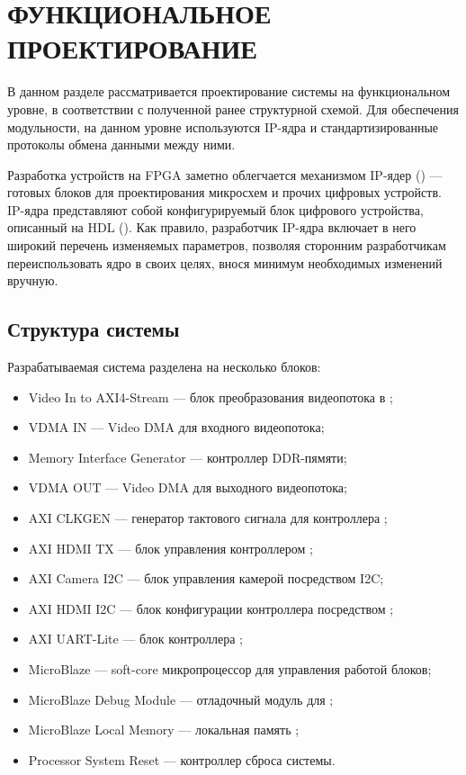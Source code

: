 \section{ФУНКЦИОНАЛЬНОЕ ПРОЕКТИРОВАНИЕ}
\label{sec:functional}

В данном разделе рассматривается проектирование системы на функциональном уровне, в
соответствии с полученной ранее структурной схемой. Для обеспечения модульности,
на данном уровне используются IP-ядра и стандартизированные протоколы обмена данными
между ними.

Разработка устройств на FPGA заметно облегчается механизмом IP-ядер () --- готовых
блоков для проектирования микросхем и прочих цифровых устройств. IP-ядра представляют собой
конфигурируемый блок цифрового устройства, описанный на HDL ().
Как правило, разработчик IP-ядра включает в него широкий перечень изменяемых параметров,
позволяя сторонним разработчикам переиспользовать ядро в своих целях, внося минимум необходимых
изменений вручную.

\subsection{Структура системы}
\label{sec:functional:structure}

Разрабатываемая система разделена на несколько блоков:

\begin{itemize}
  \item Video In to AXI4-Stream --- блок преобразования видеопотока в ;
  \item VDMA IN --- Video DMA для входного видеопотока;
  \item Memory Interface Generator --- контроллер DDR-пямяти;
  \item VDMA OUT --- Video DMA для выходного видеопотока;
  \item AXI CLKGEN --- генератор тактового сигнала для контроллера ;
  \item AXI HDMI TX --- блок управления контроллером ;
  \item AXI Camera I2C --- блок управления камерой посредством I2C;
  \item AXI HDMI I2C --- блок конфигурации контроллера  посредством ;
  \item AXI UART-Lite --- блок контроллера ;
  \item MicroBlaze --- soft-core микропроцессор для управления работой блоков;
  \item MicroBlaze Debug Module --- отладочный модуль для ;
  \item MicroBlaze Local Memory --- локальная память ;
  \item Processor System Reset --- контроллер сброса системы.
\end{itemize}

